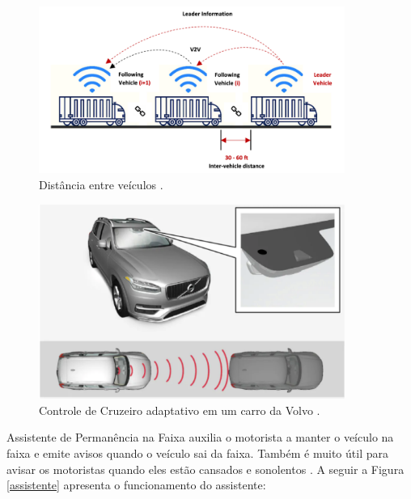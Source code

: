 \begin{figure}[H]
\centering
\includegraphics[width=10cm]{Figures/cruzeiro.png}
\caption{Distância entre veículos \cite{review-auto}.}
\label{cruzeiro}
\end{figure}


\begin{figure}[H]
\centering
\includegraphics[width=10cm]{Figures/ACC.png}
\caption{Controle de Cruzeiro adaptativo em um carro da Volvo \cite{caio}.}
\label{ACC}
\end{figure}


 \label{faixa}

Assistente de Permanência na Faixa auxilia o motorista a manter o veículo na faixa e emite avisos quando o veículo sai da faixa. Também é muito útil para avisar os motoristas quando eles estão cansados e sonolentos \cite{caio}. A seguir a Figura \ref{assistente} apresenta o funcionamento do assistente:

